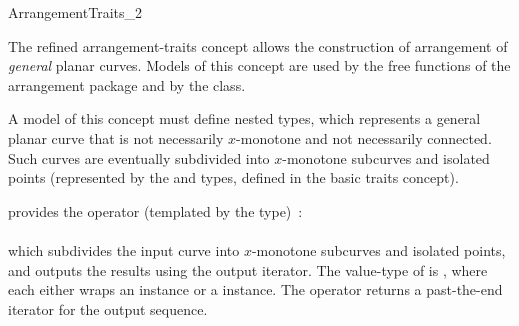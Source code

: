 
\ccRefPageBegin

\begin{ccRefConcept}{ArrangementTraits_2}

\ccDefinition

The refined arrangement-traits concept allows the construction of arrangement
of {\sl general} planar curves. Models of this concept are used
by the free  functions of the arrangement package and
by the  class.

A model of this concept must define nested  types, which
represents a general planar curve that is not necessarily $x$-monotone
and not necessarily connected. Such curves are eventually subdivided into
$x$-monotone subcurves and isolated points (represented by the 
and  types, defined in the basic traits concept).

\ccRefines
{}

\ccTypes



\ccThreeToTwo

{provides the operator (templated by the  type)~: \\
  \\
 which subdivides the input curve  into $x$-monotone subcurves and
 isolated points, and outputs the results using the output iterator.
 The value-type of  is , where each
  either wraps an  instance or a
  instance. The operator returns a past-the-end iterator
 for the output sequence.}

\ccCreation
{}

\ccThreeToTwo


\end{ccRefConcept}
